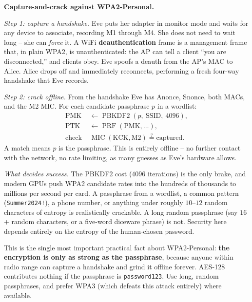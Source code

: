 \begin{attackbox}
\textbf{Capture-and-crack against WPA2-Personal.}

\emph{Step 1: capture a handshake.} Eve puts her adapter in monitor mode and
waits for any device to associate, recording M1 through M4. She does not need to
wait long -- she can \emph{force} it. A WiFi \textbf{deauthentication} frame is a
management frame that, in plain WPA2, is unauthenticated: the AP can tell a client
``you are disconnected,'' and clients obey. Eve spoofs a deauth from the AP's MAC
to Alice. Alice drops off and immediately reconnects, performing a fresh four-way
handshake that Eve records.

\emph{Step 2: crack offline.} From the handshake Eve has Anonce, Snonce, both
MACs, and the M2 MIC. For each candidate passphrase $p$ in a wordlist:
\begin{align*}
  \text{PMK} &\gets \operatorname{PBKDF2}(p,\ \text{SSID},\ 4096), \\
  \text{PTK} &\gets \operatorname{PRF}(\text{PMK}, \dots), \\
  \text{check } &\operatorname{MIC}(\text{KCK}, \text{M2}) \stackrel{?}{=} \text{captured}.
\end{align*}
A match means $p$ is the passphrase. This is entirely offline -- no further
contact with the network, no rate limiting, as many guesses as Eve's hardware
allows.

\emph{What decides success.} The PBKDF2 cost ($4096$ iterations) is the only
brake, and modern GPUs push WPA2 candidate rates into the hundreds of thousands
to millions per second per card. A passphrase from a wordlist, a common pattern
(\texttt{Summer2024!}), a phone number, or anything under roughly $10$--$12$
random characters of entropy is realistically crackable. A long random passphrase
(say $16$+ random characters, or a five-word diceware phrase) is not. Security here
depends entirely on the entropy of the human-chosen password.
\end{attackbox}

\begin{focusbox}
This is the single most important practical fact about WPA2-Personal: \textbf{the
encryption is only as strong as the passphrase}, because anyone within radio range
can capture a handshake and grind it offline forever. AES-128 contributes nothing
if the passphrase is \texttt{password123}. Use long, random passphrases, and
prefer WPA3 (which defeats this attack entirely) where available.
\end{focusbox}

